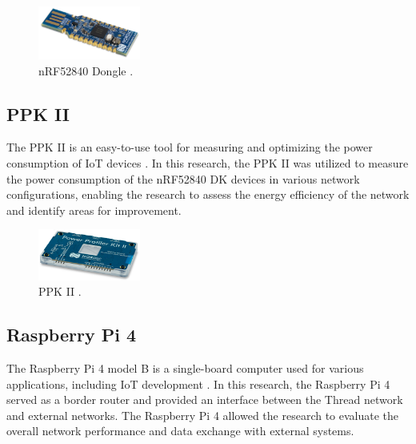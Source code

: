 \begin{figure}[H]
    \centering
    \includegraphics[width=0.3\textwidth]{images/situational_theoretical_analysis/nRF52840_Dongle.png}
    \caption{\gls{nRF}52840 Dongle \cite{Semiconductor_Nordic_Dongle_Brief_2018_2.0}.}
    \label{fig:nRF52840_dongle}
\end{figure}

\subsection{\texorpdfstring{\acrlong{PPK}}{PPK} II}

The \acrfull{PPK} II is an easy-to-use tool for measuring and optimizing the power consumption of \gls{IoT} devices \cite{Semiconductor_Nordic_PPK_II_2018_1.0}. In this research, the \gls{PPK} II was utilized to measure the power consumption of the \gls{nRF}52840 \gls{DK} devices in various network configurations, enabling the research to assess the energy efficiency of the network and identify areas for improvement.

\begin{figure}[H]
    \centering
    \includegraphics[width=0.3\textwidth]{images/situational_theoretical_analysis/nRF_Power_Profiler_Kit_II.png}
    \caption{\gls{PPK} II \cite{Semiconductor_Nordic_PPK_II_2018_1.0}.}
    \label{fig:nRF_Power_Profiler_Kit_II}
\end{figure}

\subsection{Raspberry Pi 4}

The Raspberry Pi 4 model B is a single-board computer used for various applications, including \gls{IoT} development \cite{alm2019internet}. In this research, the Raspberry Pi 4 served as a border router and provided an interface between the Thread network and external networks. The Raspberry Pi 4 allowed the research to evaluate the overall network performance and data exchange with external systems.

